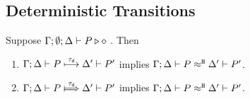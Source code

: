 \subsection{Deterministic Transitions}
\label{app:sub_tau_inert}



\begin{proposition}
	\label{app:lem:tau_inert}
	Suppose $\Gamma; \emptyset; \Delta \vdash P \triangleright \diamond$  .
	Then
	\begin{enumerate}[1.]
		\item	$\Gamma; \Delta \vdash P \stackrel{\tau_{\mathsf{d}}}{\longmapsto} \Delta' \vdash P'$ implies
			$\Gamma; \Delta \vdash P \approx^\mathtt{H} \Delta' \vdash P'$.
		\item	$\horel{\Gamma}{\Delta}{P}{\Hby{\dtau}}{\Delta'}{P'}$ implies
			$\Gamma; \Delta \vdash P \approx^\mathtt{H} \Delta' \vdash P'$.
	\end{enumerate}
\end{proposition}


